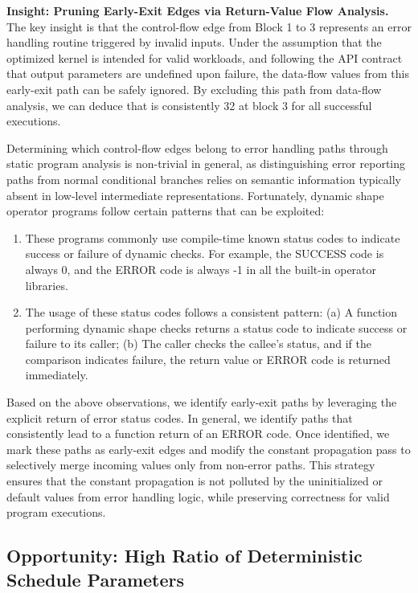 \textbf{Insight: Pruning Early-Exit Edges via Return-Value Flow Analysis.}
The key insight is that the control-flow edge from Block 1 to 3 represents an error handling routine triggered by invalid inputs.
Under the assumption that the optimized kernel is intended for valid workloads, and following the API contract that output parameters are undefined upon failure, the data-flow values from this early-exit path can be safely ignored.
By excluding this path from data-flow analysis, we can deduce that  is consistently 32 at block 3 for all successful executions.

Determining which control-flow edges belong to error handling paths through static program analysis is non-trivial in general, as distinguishing error reporting paths from normal conditional branches relies on semantic information typically absent in low-level intermediate representations. 
Fortunately, dynamic shape operator programs follow certain patterns that can be exploited:
\begin{enumerate}
    \item These programs commonly use compile-time known status codes to indicate success or failure of dynamic checks. For example, the SUCCESS code is always 0, and the ERROR code is always -1 in all the built-in operator libraries. 
    \item The usage of these status codes follows a consistent pattern: (a) A function performing dynamic shape checks returns a status code to indicate success or failure to its caller; (b) The caller checks the callee's status, and if the comparison indicates failure, the return value or ERROR code is returned immediately.
\end{enumerate}

Based on the above observations, we identify early-exit paths by leveraging the explicit return of error status codes.
In general, we identify paths that consistently lead to a function return of an ERROR code. 
Once identified, we mark these paths as early-exit edges and modify the constant propagation pass to selectively merge incoming values only from non-error paths.
This strategy ensures that the constant propagation is not polluted by the uninitialized or default values from error handling logic, while preserving correctness for valid program executions.

\subsection{Opportunity: High Ratio of Deterministic Schedule Parameters}
\label{sec:motivation:opportunity}

